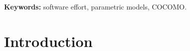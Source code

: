 \documentclass[final,twocolumn]{elsarticle}
\theoremstyle{break}
\begin{document}

 
\vspace{1mm}
\noindent
{\bf Keywords:} software effort, parametric models, COCOMO.

\section{Introduction}
\end{document}

